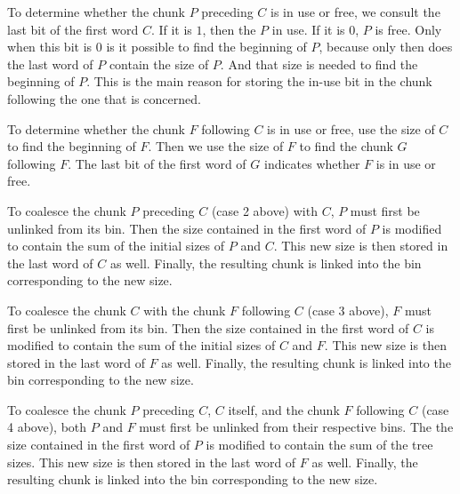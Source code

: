 To determine whether the chunk $P$ preceding $C$ is in use or free, we
consult the last bit of the first word $C$.  If it is $1$, then the
$P$ in use.  If it is $0$, $P$ is free.  Only when this bit is $0$ is
it possible to find the beginning of $P$, because only then does the
last word of $P$ contain the size of $P$.  And that size is needed to
find the beginning of $P$.  This is the main reason for storing the
in-use bit in the chunk following the one that is concerned.

To determine whether the chunk $F$ following $C$ is in use or free,
use the size of $C$ to find the beginning of $F$.  Then we use the
size of $F$ to find the chunk $G$ following $F$.  The last bit of the
first word of $G$ indicates whether $F$ is in use or free.

To coalesce the chunk $P$ preceding $C$ (case 2 above) with $C$, $P$
must first be unlinked from its bin.  Then the size contained in the
first word of $P$ is modified to contain the sum of the initial sizes
of $P$ and $C$.  This new size is then stored in the last word of $C$
as well.  Finally, the resulting chunk is linked into the bin
corresponding to the new size.

To coalesce the chunk $C$ with the chunk $F$ following $C$ (case 3
above), $F$ must first be unlinked from its bin.  Then the size
contained in the first word of $C$ is modified to contain the sum of
the initial sizes of $C$ and $F$.  This new size is then stored in the
last word of $F$ as well.  Finally, the resulting chunk is linked into
the bin corresponding to the new size.

To coalesce the chunk $P$ preceding $C$, $C$ itself, and the chunk $F$
following $C$ (case 4 above), both $P$ and $F$ must first be unlinked
from their respective bins.  The the size contained in the first word
of $P$ is modified to contain the sum of the tree sizes.  This new
size is then stored in the last word of $F$ as well.  Finally, the
resulting chunk is linked into the bin corresponding to the new size.
